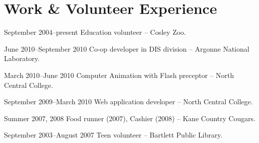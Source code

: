 \documentclass[11pt]{simplecv}
\begin{document}
  \section{Work \& Volunteer Experience}
  \begin{topic}
    \item[September 2004--present] Education volunteer -- Cosley Zoo.
    \item[June 2010--September 2010] Co-op developer in DIS division -- Argonne National Laboratory.
    \item[March 2010--June 2010] Computer Animation with Flash preceptor -- North Central College.
    \item[September 2009--March 2010] Web application developer -- North Central College.
    \item[Summer 2007, 2008] Food runner (2007), Cashier (2008) -- Kane Country Cougars.
    \item[September 2003--August 2007] Teen volunteer -- Bartlett Public Library.
  \end{topic}
\end{document}

